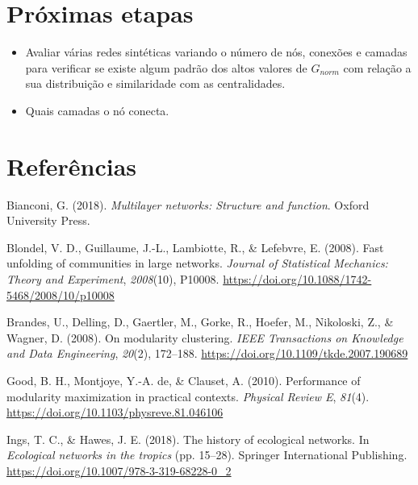 \documentclass[
  12pt,
]{article}
\begin{document}
\pagebreak

\hypertarget{pruxf3ximas-etapas}{%
\section{Próximas etapas}\label{pruxf3ximas-etapas}}

\begin{itemize}
    \item Avaliar várias redes sintéticas variando o número de nós, conexões e camadas para verificar se existe algum padrão dos altos valores de $G_{norm}$ com relação a sua distribuição e similaridade com as centralidades.
    \item Quais camadas o nó conecta.
\end{itemize}

\clearpage

\hypertarget{referuxeancias}{%
\section{Referências}\label{referuxeancias}}

\hypertarget{refs}{}
\leavevmode\hypertarget{ref-Bianconi2018}{}%
Bianconi, G. (2018). \emph{Multilayer networks: Structure and function}.
Oxford University Press.

\leavevmode\hypertarget{ref-Blondel2008}{}%
Blondel, V. D., Guillaume, J.-L., Lambiotte, R., \& Lefebvre, E. (2008).
Fast unfolding of communities in large networks. \emph{Journal of
Statistical Mechanics: Theory and Experiment}, \emph{2008}(10), P10008.
\url{https://doi.org/10.1088/1742-5468/2008/10/p10008}

\leavevmode\hypertarget{ref-Brandes2008}{}%
Brandes, U., Delling, D., Gaertler, M., Gorke, R., Hoefer, M.,
Nikoloski, Z., \& Wagner, D. (2008). On modularity clustering.
\emph{IEEE Transactions on Knowledge and Data Engineering},
\emph{20}(2), 172--188. \url{https://doi.org/10.1109/tkde.2007.190689}

\leavevmode\hypertarget{ref-Good2010}{}%
Good, B. H., Montjoye, Y.-A. de, \& Clauset, A. (2010). Performance of
modularity maximization in practical contexts. \emph{Physical Review E},
\emph{81}(4). \url{https://doi.org/10.1103/physreve.81.046106}

\leavevmode\hypertarget{ref-Ings2018}{}%
Ings, T. C., \& Hawes, J. E. (2018). The history of ecological networks.
In \emph{Ecological networks in the tropics} (pp. 15--28). Springer
International Publishing.
\url{https://doi.org/10.1007/978-3-319-68228-0_2}
\end{document}
